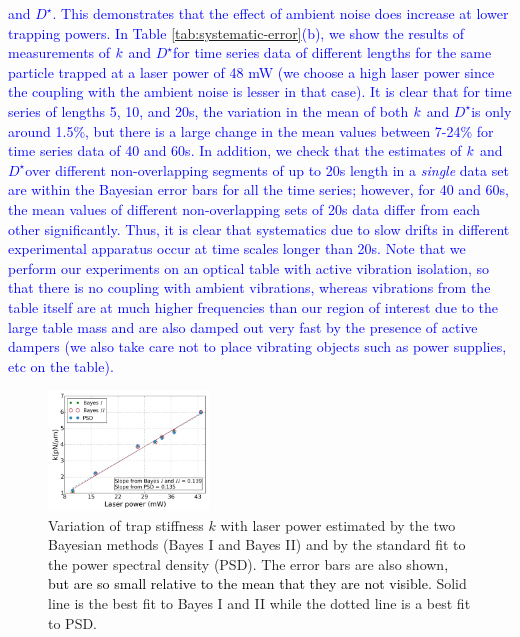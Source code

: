 \documentclass[fleqn,10pt]{wlscirep}
\begin{document}
\textcolor{blue}{and $D^{\star}$. This demonstrates that the effect
of ambient noise does increase at lower trapping powers. In Table
\ref{tab:systematic-error}(b), we show the results of measurements
of }${\color{blue}k}$ \textcolor{blue}{and $D^{\star}$for time series
data of different lengths for the same particle trapped at a laser
power of 48 mW (we choose a high laser power since the coupling with
the ambient noise is lesser in that case). It is clear that for time
series of lengths 5, 10, and 20s, the variation in the mean of both
}${\color{blue}k}$ \textcolor{blue}{and $D^{\star}$is only around
1.5\%, but there is a large change in the mean values between 7-24\%
for time series data of 40 and 60s. In addition, we check that the
estimates of }${\color{blue}k}$ \textcolor{blue}{and $D^{\star}$over
different non-overlapping segments of up to 20s length in a }\textcolor{blue}{\emph{single
}}\textcolor{blue}{data set are within the Bayesian error bars for
all the time series; however, for 40 and 60s, the mean values of different
non-overlapping sets of 20s data differ from each other significantly.
Thus, it is clear that systematics due to slow drifts in different
experimental apparatus occur at time scales longer than 20s. Note
that we perform our experiments on an optical table with active vibration
isolation, so that there is no coupling with ambient vibrations, whereas
vibrations from the table itself are at much higher frequencies than
our region of interest due to the large table mass and are also damped
out very fast by the presence of active dampers (we also take care
not to place vibrating objects such as power supplies, etc on the
table).}
\begin{figure}[h]
\includegraphics[width=0.38\textwidth]{figure4}

\caption{Variation of trap stiffness $k$ with laser power estimated by the
two Bayesian methods (Bayes I and Bayes II) and by the standard fit
to the power spectral density (PSD). The error bars are also shown\textcolor{black}{,
but are so small relative to the mean that they are not visible}.
Solid line is the best fit to Bayes I and II while the dotted line
is a best fit to PSD.\label{fig:Variation-of-trap}}
\end{figure}
\end{document}
